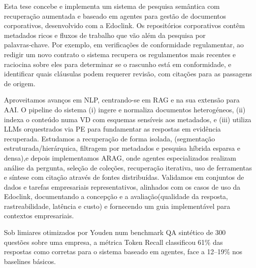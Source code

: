 \glsresetall
\noindent
Esta tese concebe e implementa um sistema de pesquisa semântica com recuperação aumentada e baseado em agentes para gestão de documentos corporativos, desenvolvido com a Edoclink. Os repositórios corporativos contêm metadados ricos e fluxos de trabalho que vão além da pesquisa por palavras‑chave. Por exemplo, em verificações de conformidade regulamentar, ao redigir um novo contrato o sistema recupera os regulamentos mais recentes e raciocina sobre eles para determinar se o rascunho está em conformidade, e identificar quais cláusulas podem requerer revisão, com citações para as passagens de origem.

Aproveitamos avanços em \gls{NLP}, centrando-se em \gls{RAG} e na sua extensão para \gls{AAI}. O pipeline do sistema (i) ingere e normaliza documentos heterogéneos, (ii) indexa o conteúdo numa \gls{VD} com esquemas sensíveis aos metadados, e (iii) utiliza \glspl{LLM} orquestrados via \gls{PE} para fundamentar as respostas em evidência recuperada. Estudamos a recuperação de forma isolada, (segmentação estruturada/hierárquica, filtragem por metadados e pesquisa híbrida esparsa e densa),e depois implementamos \gls{ARAG}, onde agentes especializados realizam análise da pergunta, seleção de coleções, recuperação iterativa, uso de ferramentas e síntese com citação através de fontes distribuídas.
Validamos em conjuntos de dados e tarefas empresariais representativos, alinhados com os casos de uso da Edoclink, documentando a concepção e a avaliação(qualidade da resposta, rastreabilidade, latência e custo) e fornecendo um guia implementável para contextos empresariais.

Sob limiares otimizados por Youden num benchmark \gls{QA} sintético de 300 questões sobre uma empresa, a métrica Token Recall classificou 61\% das respostas como corretas para o sistema baseado em agentes, face a 12–19\% nos baselines básicos.





